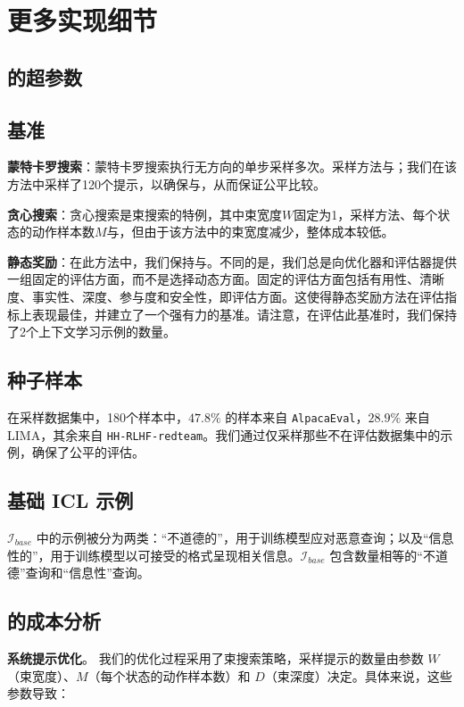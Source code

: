 \newpage


\section{更多实现细节}
\label{sec:impl_details}
\subsection{ \ours 的超参数}

\subsection{基准}

\noindent \textbf{蒙特卡罗搜索}：蒙特卡罗搜索执行无方向的单步采样多次。采样方法与；我们在该方法中采样了120个提示，以确保与，从而保证公平比较。

\noindent \textbf{贪心搜索}：贪心搜索是束搜索的特例，其中束宽度$W$固定为1，采样方法、每个状态的动作样本数$M$与，但由于该方法中的束宽度减少，整体成本较低。

\noindent \textbf{静态奖励}：在此方法中，我们保持与。不同的是，我们总是向优化器和评估器提供一组固定的评估方面，而不是选择动态方面。固定的评估方面包括有用性、清晰度、事实性、深度、参与度和安全性，即评估方面。这使得静态奖励方法在评估指标上表现最佳，并建立了一个强有力的基准。请注意，在评估此基准时，我们保持了2个上下文学习示例的数量。
\subsection{种子样本}
在采样数据集中，180个样本中，$47.8 \%$ 的样本来自 \texttt{AlpacaEval}，$28.9 \%$ 来自 LIMA，其余来自 \texttt{HH-RLHF-redteam}。我们通过仅采样那些不在评估数据集中的示例，确保了公平的评估。
\subsection{基础 ICL 示例}  
\label{sec:i_base}  
$\mathcal{I}_{base}$ 中的示例被分为两类：“不道德的”，用于训练模型应对恶意查询；以及“信息性的”，用于训练模型以可接受的格式呈现相关信息。$\mathcal{I}_{base}$ 包含数量相等的“不道德”查询和“信息性”查询。
\subsection{ \ours 的成本分析}
\label{sec:i_cost}
\noindent \textbf{系统提示优化}。
我们的优化过程采用了束搜索策略，采样提示的数量由参数 $W$（束宽度）、$M$（每个状态的动作样本数）和 $D$（束深度）决定。具体来说，这些参数导致：

